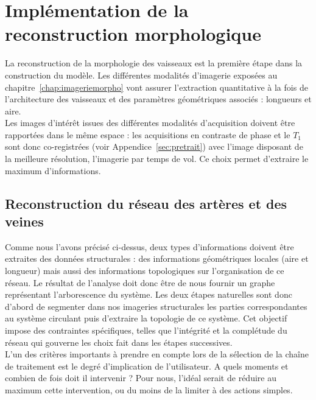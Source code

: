 
\chapter{Implémentation de la reconstruction morphologique}
\label{chap:morpho}	
	\minitoc
	

La reconstruction de la morphologie des vaisseaux est la première étape dans la construction du modèle. Les différentes modalités d’imagerie exposées au chapitre~\ref{chap:imageriemorpho} vont assurer l’extraction quantitative à la fois de l’architecture des vaisseaux et des paramètres géométriques associés : longueurs et aire. \\
Les images d’intérêt issues des différentes modalités d’acquisition doivent être rapportées dans le même espace : les acquisitions en contraste de phase et le $T_1$ sont donc co-registrées (voir Appendice~\ref{sec:pretrait}) avec l’image disposant de la meilleure résolution, l’imagerie par temps de vol. Ce choix permet d’extraire le maximum d’informations. 
\section{Reconstruction du réseau des artères et des veines}
Comme nous l’avons précisé ci-dessus, deux types d’informations doivent être extraites des données structurales : des informations géométriques locales (aire et longueur) mais aussi des informations topologiques sur l’organisation de ce réseau. Le résultat de l’analyse doit donc être de nous fournir un graphe représentant l’arborescence du système. Les deux étapes naturelles sont donc d’abord de segmenter dans nos imageries structurales les parties correspondantes au système circulant puis d’extraire la topologie de ce système. Cet objectif impose des contraintes spécifiques, telles que l’intégrité et la complétude du réseau qui gouverne les choix fait dans les étapes successives.\\
L’un des critères importants à prendre en compte lors de la sélection de la chaîne de traitement est le degré d’implication de l’utilisateur. A quels moments et combien de fois doit il intervenir ? Pour nous, l’idéal serait de réduire au maximum cette intervention, ou du moins de la limiter à des actions simples. 
